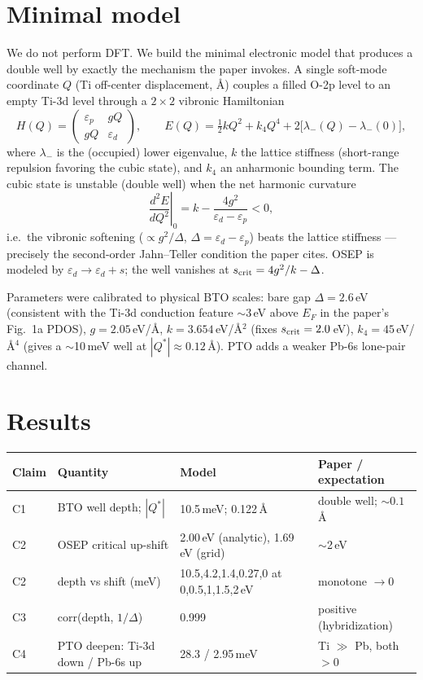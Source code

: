 \documentclass[11pt]{article}
\begin{document}
\section{Minimal model}
We do not perform DFT. We build the minimal electronic model that produces a
double well by exactly the mechanism the paper invokes. A single soft-mode
coordinate $Q$ (Ti off-center displacement, \AA) couples a filled O-2p level to
an empty Ti-3d level through a $2\times2$ vibronic Hamiltonian
\[
H(Q)=\begin{pmatrix} \varepsilon_p & gQ \\ gQ & \varepsilon_d \end{pmatrix},
\qquad
E(Q)=\tfrac12 k Q^2 + k_4 Q^4 + 2\big[\lambda_-(Q)-\lambda_-(0)\big],
\]
where $\lambda_-$ is the (occupied) lower eigenvalue, $k$ the lattice stiffness
(short-range repulsion favoring the cubic state), and $k_4$ an anharmonic
bounding term. The cubic state is unstable (double well) when the net harmonic
curvature
\[
\left.\frac{d^2E}{dQ^2}\right|_0 = k - \frac{4g^2}{\varepsilon_d-\varepsilon_p} < 0,
\]
i.e.\ the vibronic softening ($\propto g^2/\Delta$, $\Delta=\varepsilon_d-\varepsilon_p$)
beats the lattice stiffness --- precisely the second-order Jahn--Teller
condition the paper cites. OSEP is modeled by $\varepsilon_d\!\to\!\varepsilon_d+s$;
the well vanishes at $s_{\rm crit}=4g^2/k-\Delta$.

Parameters were calibrated to physical BTO scales: bare gap $\Delta=2.6$\,eV
(consistent with the Ti-3d conduction feature $\sim$3\,eV above $E_F$ in the
paper's Fig.~1a PDOS), $g=2.05$\,eV/\AA, $k=3.654$\,eV/\AA$^2$ (fixes
$s_{\rm crit}=2.0$\,eV), $k_4=45$\,eV/\AA$^4$ (gives a $\sim$10\,meV well at
$|Q^\ast|\approx0.12$\,\AA). PTO adds a weaker Pb-6s lone-pair channel.

\section{Results}
\begin{table}[h]
\centering
\begin{tabular}{llll}
\toprule
Claim & Quantity & Model & Paper / expectation \\
\midrule
C1 & BTO well depth; $|Q^\ast|$ & 10.5\,meV; 0.122\,\AA & double well; $\sim0.1$\,\AA \\
C2 & OSEP critical up-shift & 2.00\,eV (analytic), 1.69\,eV (grid) & $\sim$2\,eV \\
C2 & depth vs shift (meV) & 10.5,4.2,1.4,0.27,0 at 0,0.5,1,1.5,2\,eV & monotone $\to0$ \\
C3 & corr(depth, $1/\Delta$) & 0.999 & positive (hybridization) \\
C4 & PTO deepen: Ti-3d down / Pb-6s up & 28.3 / 2.95\,meV & Ti $\gg$ Pb, both $>0$ \\
\bottomrule
\end{tabular}
\end{table}
\end{document}
